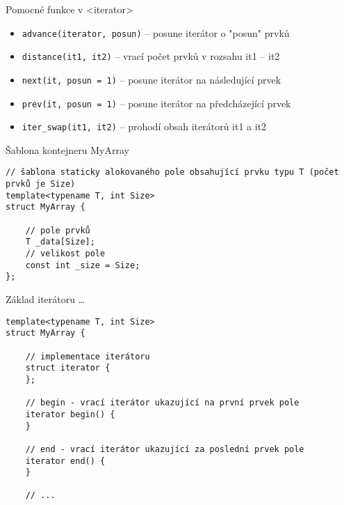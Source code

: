 \begin{frame}[fragile]
\begin{block}{Pomocné funkce v <iterator>}
\begin{itemize}
\item \lstinline|advance(iterator, posun)| -- posune iterátor o "posun" prvků
\item \lstinline|distance(it1, it2)| -- vrací počet prvků v rozsahu it1 -- it2
\item \lstinline|next(it, posun = 1)| -- posune iterátor na následující prvek
\item \lstinline|prev(it, posun = 1)| -- posune iterátor na předcházející prvek
\item \lstinline|iter_swap(it1, it2)| -- prohodí obsah iterátorů it1 a it2
\end{itemize}
\end{block}
\end{frame}





\begin{frame}[fragile]
\begin{exampleblock}{{\YES} Šablona kontejneru MyArray}
\begin{lstlisting}
// šablona staticky alokovaného pole obsahující prvku typu T (počet prvků je Size)
template<typename T, int Size>
struct MyArray {

	// pole prvků
	T _data[Size];
	// velikost pole
	const int _size = Size;
};
\end{lstlisting}
\end{exampleblock}	
\end{frame}

\begin{frame}[fragile]
\begin{exampleblock}{{\YES} Základ iterátoru \ldots}
\begin{lstlisting}
template<typename T, int Size>
struct MyArray {

	// implementace iterátoru
	struct iterator {
	};

	// begin - vrací iterátor ukazující na první prvek pole
	iterator begin() {
	}

	// end - vrací iterátor ukazující za poslední prvek pole
	iterator end() {
	}
	
	// ...
\end{lstlisting}
\end{exampleblock}	
\end{frame}



